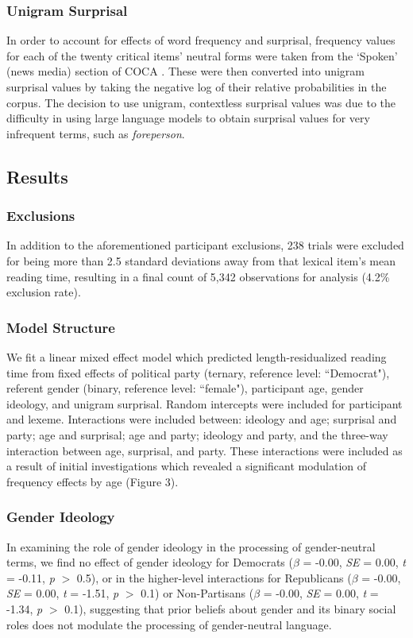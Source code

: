 \documentclass[10pt,letterpaper]{article}
\begin{document}
	\subsubsection{Unigram Surprisal}
	In order to account for effects of word frequency and surprisal, frequency values for each of the twenty critical items' neutral forms were taken from the `Spoken' (news media) section of COCA \parencite{coca}. These were then converted into unigram surprisal values by taking the negative log of their relative probabilities in the corpus. The decision to use unigram, contextless surprisal values was due to the difficulty in using large language models to obtain surprisal values for very infrequent terms, such as \textit{foreperson}. 
	
	\subsection{Results}
	
	\subsubsection{Exclusions}
	In addition to the aforementioned participant exclusions, 238 trials were excluded for being more than 2.5 standard deviations away from that lexical item's mean reading time, resulting in a final count of 5,342 observations for analysis (4.2\% exclusion rate).
	
	\subsubsection{Model Structure} 
	We fit a linear mixed effect model which predicted length-residualized reading time from fixed effects of political party (ternary, reference level: ``Democrat"), referent gender (binary, reference level: ``female"), participant age, gender ideology, and unigram surprisal. Random intercepts were included for participant and lexeme. Interactions were included between: ideology and age; surprisal and party; age and surprisal; age and party; ideology and party, and the three-way interaction between age, surprisal, and party. These interactions were included as a result of initial investigations which revealed a significant modulation of frequency effects by age (Figure 3).
	
	\subsubsection{Gender Ideology} In examining the role of gender ideology in the processing of gender-neutral terms, we find no effect of gender ideology for Democrats ($\beta$ = -0.00, \textit{SE} = 0.00, \textit{t} = -0.11, \textit{p} $>$ 0.5), or in the higher-level interactions for Republicans ($\beta$ = -0.00, \textit{SE} = 0.00, \textit{t} = -1.51, \textit{p} $>$ 0.1) or Non-Partisans ($\beta$ = -0.00, \textit{SE} = 0.00, \textit{t} = -1.34, \textit{p} $>$ 0.1), suggesting that prior beliefs about gender and its binary social roles does not modulate the processing of gender-neutral language.
	
\end{document}
